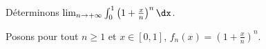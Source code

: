 \documentclass[a4paper,10pt]{report}
\begin{document}
\begin{Exemple} Déterminons $\lim_{n \rightarrow + \infty} \int_{0}^1 \left( 1 + \frac{x}{n}\right)^n \dx$.

\medskip

Posons pour tout $n \geq 1$ et $x \in [0,1]$, $f_n(x) = \left( 1 + \frac{x}{n}\right)^n$.

%
%
%
%
%

\end{Exemple}
\end{document}
